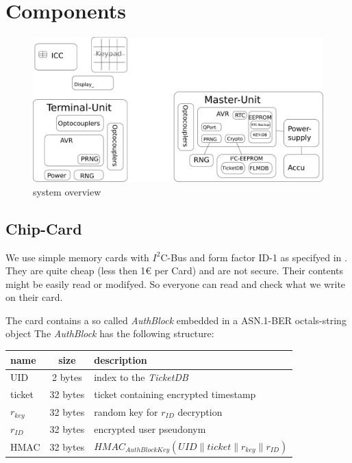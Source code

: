 \section{Components}
\begin{figure}
\includegraphics[scale=0.17]{Overview} 
\caption{system overview}
\end{figure}


\subsection{Chip-Card}
We use simple memory cards with $I^2$C-Bus and form factor ID-1 as specifyed in \cite{ISO7816-1}\cite{ISO7816-2}. They are quite cheap (less then 1\euro{} per Card) and are not secure. Their contents might be easily read or modifyed. So everyone can read and check what we write on their card.

The card contains a so called \textit{AuthBlock} embedded in a ASN.1-BER\cite{ASN.1BER} octals-string object
The \textit{AuthBlock} has the following structure:\\
\begin{tabular}{|l|c|l|} \hline
name & size & description \\ \hline 
UID            & 2 bytes & index to the \textit{TicketDB} \\
ticket         & 32 bytes & ticket containing encrypted timestamp \\
$r_{key}$ & 32 bytes & random key for $r_{ID}$ decryption \\
$r_{ID}$   & 32 bytes & encrypted user pseudonym \\
HMAC        & 32 bytes & $HMAC_{AuthBlockKey}(UID \parallel ticket \parallel r_{key} \parallel r_{ID})$\\ \hline
\end{tabular} 

